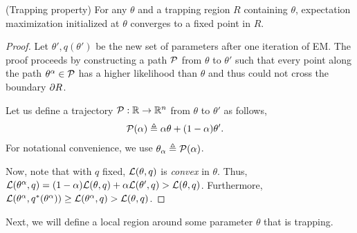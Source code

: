 \documentclass[tablecaption=bottom]{jmlr}
\begin{document}
\begin{lemma}(Trapping property)
  For any $\theta$ and a trapping region $R$ containing $\theta$, expectation
  maximization initialized at $\theta$ converges to a fixed point in $R$.
\end{lemma}
\begin{proof}
  Let $\theta', q(\theta')$ be the new set of parameters after one
  iteration of EM. The proof proceeds by constructing a path $\mathcal{P}$ from
  $\theta$ to $\theta'$ such that every point along the path
  $\theta^\alpha \in \mathcal{P}$ has a higher likelihood than $\theta$ and thus
  could not cross the boundary $\partial R$. 

  Let us define a trajectory $\mathcal{P} : \mathbb{R} \to \mathbb{R}^n$ from $\theta$ to
  $\theta'$ as follows,
  \begin{align}
    \mathcal{P}(\alpha) &\triangleq \alpha \theta + (1-\alpha) \theta'.
  \end{align}
  For notational convenience, we use $\theta_{\alpha} \triangleq \mathcal{P}(\alpha)$.

  Now, note that with $q$ fixed, $\mathcal{L}(\theta,q)$ is {\em convex} in $\theta$. Thus, 
  $\mathcal{L}(\theta^\alpha, q) = (1-\alpha)\mathcal{L}(\theta, q) + \alpha
  \mathcal{L}(\theta', q) > \mathcal{L}(\theta, q)$. Furthermore, $\mathcal{L}(\theta^\alpha,
  q^*(\theta^\alpha)) \ge \mathcal{L}(\theta^\alpha, q) > \mathcal{L}(\theta, q)$.

\end{proof}

Next, we will define a local region around some parameter $\theta$ that is trapping.
\end{document}
